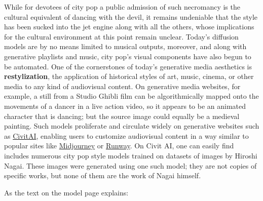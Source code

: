 \documentclass[
  letterpaper,
  DIV=11,
  numbers=noendperiod,
  oneside]{scrartcl}
\begin{document}
While for devotees of city pop a public admission of such necromancy is
the cultural equivalent of dancing with the devil, it remains undeniable
that the style has been sucked into the jet engine along with all the
others, whose implications for the cultural environment at this point
remain unclear. Today's diffusion models are by no means limited to
musical outputs, moreover, and along with generative playlists and
music, city pop's visual components have also begun to be automated. One
of the cornerstones of today's generative media aesthetics is
\textbf{restylization}, the application of historical styles of art,
music, cinema, or other media to any kind of audiovisual content. On
generative media websites, for example, a still from a Studio Ghibli
film can be algorithmically mapped onto the movements of a dancer in a
live action video, so it appears to be an animated character that is
dancing; but the source image could equally be a medieval painting. Such
models proliferate and circulate widely on generative websites such as
\href{https://civitai.com}{CivitAI}, enabling users to customize
audiovisual content in a way similar to popular sites like
\href{https://www.midjourney.com/}{Midjourney} or
\href{https://runwayml.com/}{Runway}. On Civit AI, one can easily find
includes numerous city pop style models trained on datasets of images by
Hiroshi Nagai. These images were generated using one such model; they
are not copies of specific works, but none of them are the work of Nagai
himself.


As the text on the model page explains:

\end{document}

